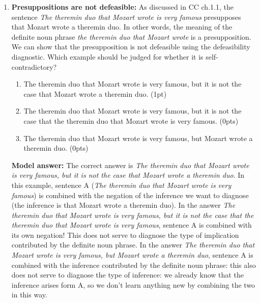 \documentclass[a4,11pt]{article}
\begin{document}
\begin{enumerate}[leftmargin = 12pt]
{\bf Model answer:} The correct answer is {\em She has a good personality, and she is attractive}. In this example, sentence A is combined with the negation of B: {\em she is attractive} is a more natural way of saying {\em it is not the case that she is not attractive}. In the answer {\em She has a good personality, and it is not the case that she has a good personality},  sentence A is combined with its own negation! This does not serve to diagnose the type of implication that B is. In the answer {\em She has a good personality, and it is not the case that she is attractive}, sentence A is combined with the inference B: this also does not serve to diagnose the type of implication that B is: we already know that B is implied by A, i.e., sentence A is compatible with B, so we don't learn anything new by combining the two in this way.
 
 
\item {\bf Presuppositions are not defeasible:} As discussed in CC ch.1.1, the sentence {\em The theremin duo that Mozart wrote is very famous} presupposes that Mozart wrote a theremin duo. In other words, the meaning of the definite noun phrase {\em the theremin duo that Mozart wrote} is a presupposition. We can show that the presupposition is not defeasible using the defeasibility diagnostic. Which example should be judged for whether it is self-contradictory?

   \begin{enumerate}[noitemsep]
        \item The theremin duo that Mozart wrote is very famous, but it is not the case that Mozart wrote a theremin duo. (1pt)
        \item The theremin duo that Mozart wrote is very famous, but it is not the case that the theremin duo that Mozart wrote is very famous. (0pts)
        \item The theremin duo that Mozart wrote is very famous, but Mozart wrote a theremin duo. (0pts)
    \end{enumerate}
    
 {\bf Model answer:} The correct answer is {\em The theremin duo that Mozart wrote is very famous, but it is not the case that Mozart wrote a theremin duo}. In this example, sentence A ({\em The theremin duo that Mozart wrote is very famous}) is combined with the negation of the inference we want to diagnose (the inference is that Mozart wrote a theremin duo). In the answer {\em The theremin duo that Mozart wrote is very famous, but it is not the case that the theremin duo that Mozart wrote is very famous},  sentence A is combined with its own negation! This does not serve to diagnose the type of implication contributed by the definite noun phrase. In the answer {\em The theremin duo that Mozart wrote is very famous, but Mozart wrote a theremin duo}, sentence A is combined with the inference contributed by the definite noun phrase: this also does not serve to diagnose the type of inference: we already know that the inference arises form A, so we don't learn anything new by combining the two in this way.
 

\end{enumerate}
\end{document}

